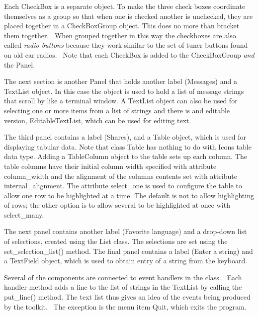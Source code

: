 Each \textsf{CheckBox} is a separate object. To make the three check
boxes coordinate themselves as a group so that when one is checked
another is unchecked, they are placed together in a
\textsf{CheckBoxGroup} object. This does no more than
{\textquotedbl}bracket{\textquotedbl} them together. \ When grouped
together in this way the checkboxes are also called \textit{radio buttons} because they work similar to the set of
tuner buttons found on old car radios. \ Note that each
\textsf{CheckBox} is added to the \textsf{CheckBoxGroup} \textit{and}
the \textsf{Panel}.

The next section is another \textsf{Panel} that holds another label
({\textquotedbl}Messages{\textquotedbl}) and a \textsf{TextList}
object. In this case the object is used to hold a list of message
strings that scroll by like a terminal window. A \textsf{TextList}
object can also be used for selecting one or more items from a list of
strings and there is and editable version, \textsf{EditableTextList},
which can be used for editing text.

The third panel contains a label ({\textquotedbl}Shares{\textquotedbl}),
and a \textsf{Table} object, which is used for displaying tabular data.
Note that class \textsf{Table} has nothing to do with
Icon{\textquotesingle}s table data type. Adding a \textsf{TableColumn}
object to the table sets up each column. The table columns have their
initial column width specified with attribute \textsf{column\_width}
and the alignment of the column{\textquotesingle}s contents set with
attribute \textsf{internal\_alignment}. The attribute
\textsf{select\_one} is used to configure the table to allow one row to
be highlighted at a time. The default is not to allow highlighting of
rows; the other option is to allow several to be highlighted at once
with \textsf{select\_many}.

The next panel contains another label ({\textquotedbl}Favorite
language{\textquotedbl}) and a drop-down list of selections, created
using the \textsf{List} class. The selections are set using the
\textsf{set\_selection\_list()} method. The final panel contains a
label ({\textquotedbl}Enter a string{\textquotedbl}) and a
\textsf{TextField} object, which is used to obtain entry of a string
from the keyboard.

Several of the components are connected to event handlers in the class.
\ Each handler method adds a line to the list of strings in the
\textsf{TextList} by calling the \textsf{put\_line()} method. The text
list thus gives an idea of the events being produced by the toolkit.
\ The exception is the menu item \textsf{Quit}, which exits the
program.

